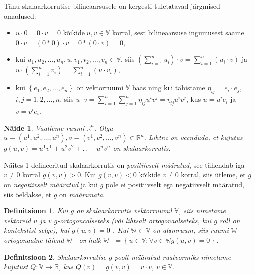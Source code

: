 \documentclass[a4paper,12pt]{article}
\newtheorem{definitsioon}{Definitsioon}[section]
\newtheorem{naide}{Näide}[section]
\numberwithin{equation}{section}
\begin{document}
Tänu skalaarkorrutise bilineaarsusele on kergesti tuletatavad järgmised omadused:
\begin{itemize}
\item $u \cdot 0 = 0 \cdot v = 0$ kõikide $u, v \in \mathbb{V}$ korral, sest bilineaarsuse ingumusest saame $0 \cdot v = \left(0*0\right) \cdot v = 0*\left(0 \cdot v \right) = 0$,
\item kui $u_1, u_2, \dots, u_n, u, v_1, v_2, \dots, v_n \in \mathbb{V}$, siis $\left( \sum_{i = 1}^{n} u_i \right) \cdot v = \sum_{i = 1}^{n}  \left( u_i \cdot v \right)$ ja $u \cdot \left( \sum_{i = 1}^{n} v_i \right) = \sum_{i = 1}^{n}  \left( u \cdot v_i \right)$,
\item kui $\left\lbrace e_1, e_2, \dots, e_n \right\rbrace$ on vektorruumi $\mathbb{V}$ baas ning kui tähistame $\eta_{ij} = e_i \cdot e_j$, $i,j = 1, 2, \dots, n$, siis $u \cdot v = \sum_{i = 1}^{n} \sum_{j = 1}^{n} \eta_{ij} u^i v^j = \eta_{ij} u^i v^j$, kus $u = u^i e_i$ ja $v = v^i e_i$.
\end{itemize}

\begin{naide}
Vaatleme ruumi $\mathbb{R}^{n}$. Olgu $u = \left(u^1, u^2, \dots, u^n \right), v = \left(v^1, v^2, \dots, v^n \right) \in \mathbb{R}^{n}$. Lihtne on veenduda, et kujutus $g \left(u, v \right) = u^1v^1 + u^2v^2 + \dots + u^n v^n$ on skalaarkorrutis.
\end{naide}

Näites 1 defineeritud skalaarkorrutis on \emph{positiivselt määratud}, see tähendab iga $v \neq 0$ korral $g \left(v, v \right) > 0$. Kui $g \left(v, v \right) < 0$ kõikide $v \neq 0$ korral, siis ütleme, et $g$ on \emph{negatiivselt määratud} ja kui $g$ pole ei positiivselt ega negatiivselt määratud, siis öeldakse, et $g$ on \emph{määramata}.

\begin{definitsioon}
Kui $g$ on skalaarkorrutis vektorruumil $\mathbb{V}$, siis nimetame vektoreid $u$ ja $v$ \emph{$g$-ortogonaalseteks} (või lihtsalt \emph{ortogonaalseteks}, kui $g$ roll on kontekstist selge), kui $g \left( u, v \right) = 0$ . Kui $\mathbb{W} \subset \mathbb{V}$ on alamruum, siis ruumi $\mathbb{W}$ ortogonaalne täiend $\mathbb{W}^{\perp}$ on hulk $\mathbb{W}^{\perp} = \left\lbrace u \in \mathbb{V} : \forall v \in  \mathbb{W} g \left(u, v \right) = 0 \right\rbrace$.
\end{definitsioon}
\begin{definitsioon}
Skalaarkorrutise $g$ poolt määratud \emph{ruutvormiks} nimetame kujutust $Q : \mathbb{V} \rightarrow \mathbb{R}$, kus $Q \left( v \right) = g\left(v, v\right) = v \cdot v$, $v \in \mathbb{V}$.
\end{definitsioon}
\end{document}

